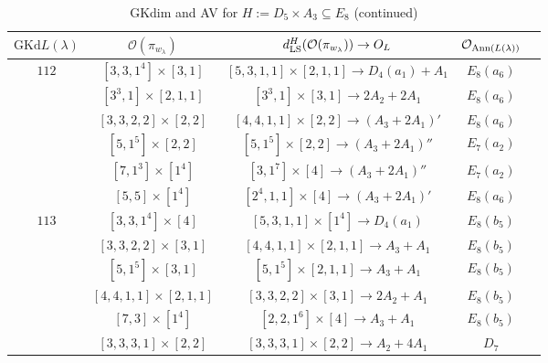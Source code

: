 \documentclass[reqno,12pt]{amsart}
\numberwithin{equation}{section}
\theoremstyle{plain}
\theoremstyle{definition}
\newcommand{\lam}{\lambda}
\renewcommand{\subset}{\subseteq}
\begin{document}
\begin{table}[htbp]
\begin{tabular}{|c|c|c|c|c|}
  
	\end{tabular}
	\bigskip
	
\end{table}

\begin{table}[htbp]\caption{ GKdim and AV for $H:=D_5\times A_3\subset E_8$ (continued)}
	\label{tabd5a3-2}
	\centering
	\renewcommand{\arraystretch}{1.5}
	\setlength\tabcolsep{5pt}
	
	\begin{tabular}{|c|c|c|c|c|}
		\hline $\mathrm{GKd} L(\lambda)$ & $\mathcal{O}(\pi_{w_{\lam}})$& $d_{\rm LS}^{H}(\mathcal{O}(\pi_{w_\lambda}))\rightarrow    O_{L}$& $\mathcal{O}_{{\rm Ann}(L(\lambda))}$ \\ \hline

$ 112$  
&  $ [3,3,1^4]\times [3,1] $ & \footnotesize{ $[5,3,1,1]\times [2,1,1]\rightarrow      D_4(a_1)+A_1$ } &   $E_8(a_6)$        \\
&  $ [3^3,1]\times [2,1,1] $ & $[3^3,1]\times [3,1]\rightarrow      2A_2+2A_1$  &   $E_8(a_6)$        \\

&  \footnotesize{$ [3,3,2,2]\times [2,2] $ } & $[4,4,1,1]\times [2,2]\rightarrow      (A_3+2A_1)'$ &   $E_8(a_6)$        \\
&\small{  $ [5,1^5]\times [2,2] $  }& $[5,1^5]\times [2,2]\rightarrow      (A_3+2A_1)''$   &   $E_7(a_2)$        \\


&  \small{$ [7,1^3]\times [1^4] $  }& $[3,1^7]\times [4]\rightarrow      (A_3+2A_1)''$  &   $E_7(a_2)$        \\
& \small{ $ [5,5]\times [1^4] $ }& $[2^4,1,1]\times [4]\rightarrow      (A_3+2A_1)'$  &   $E_8(a_6)$        \\
\hline
$ 113$  
&  $ [3,3,1^4]\times [4] $ & \small{ $[5,3,1,1]\times [1^4]\rightarrow      D_4(a_1)$ } &   $E_8(b_5)$        \\
&  $ [3,3,2,2]\times [3,1] $ & $[4,4,1,1]\times [2,1,1]\rightarrow      A_3+A_1$  &   $E_8(b_5)$        \\


&{  $ [5,1^5]\times [3,1] $}& $[5,1^5]\times [2,1,1]\rightarrow      A_3+A_1$ &   $E_8(b_5)$        \\


&  {$ [4,4,1,1]\times [2,1,1] $ }& $[3,3,2,2]\times [3,1]\rightarrow      2A_2+A_1$  &   $E_8(b_5)$        \\
&{ $ [7,3]\times [1^4] $ }& $[2,2,1^6]\times [4]\rightarrow      A_3+A_1$  &   $E_8(b_5)$        \\
&  $ [3,3,3,1]\times [2,2] $ & $[3,3,3,1]\times [2,2]\rightarrow      A_2+4A_1$  &   $D_7$        \\
\hline


\end{tabular}
\end{table}
\end{document}
